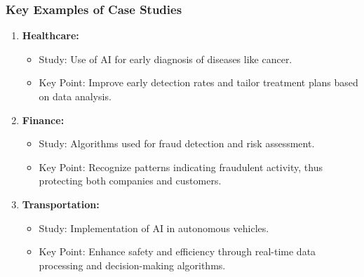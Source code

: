 \documentclass[aspectratio=169]{beamer}
\begin{document}
\begin{frame}[fragile]
    \frametitle{Key Examples of Case Studies}
    \begin{enumerate}
        \item \textbf{Healthcare:}
            \begin{itemize}
                \item Study: Use of AI for early diagnosis of diseases like cancer.
                \item Key Point: Improve early detection rates and tailor treatment plans based on data analysis.
            \end{itemize}
        \item \textbf{Finance:}
            \begin{itemize}
                \item Study: Algorithms used for fraud detection and risk assessment.
                \item Key Point: Recognize patterns indicating fraudulent activity, thus protecting both companies and customers.
            \end{itemize}
        \item \textbf{Transportation:}
            \begin{itemize}
                \item Study: Implementation of AI in autonomous vehicles.
                \item Key Point: Enhance safety and efficiency through real-time data processing and decision-making algorithms.
            \end{itemize}
    \end{enumerate}
\end{frame}
\end{document}
